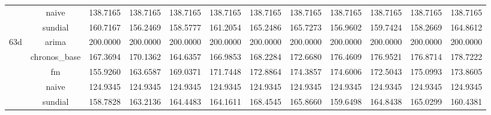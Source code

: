 \begin{table}[H]
{\begin{tabular}{cccccccccccc}
 & naive & 138.7165 & 138.7165 & 138.7165 & 138.7165 & 138.7165 & 138.7165 & 138.7165 & 138.7165 & 138.7165 & 138.7165 \\
 & sundial & 160.7167 & 156.2469 & 158.5777 & 161.2054 & 165.2486 & 165.7273 & 156.9602 & 159.7424 & 158.2669 & 164.8612 \\
\multirow[c]{5}{*}{63d} & arima & 200.0000 & 200.0000 & 200.0000 & 200.0000 & 200.0000 & 200.0000 & 200.0000 & 200.0000 & 200.0000 & 200.0000 \\
 & chronos_base & 167.3694 & 170.1362 & 164.6357 & 166.9853 & 168.2284 & 172.6680 & 176.4609 & 176.9521 & 176.8714 & 178.7222 \\
 & fm & 155.9260 & 163.6587 & 169.0371 & 171.7448 & 172.8864 & 174.3857 & 174.6006 & 172.5043 & 175.0993 & 173.8605 \\
 & naive & 124.9345 & 124.9345 & 124.9345 & 124.9345 & 124.9345 & 124.9345 & 124.9345 & 124.9345 & 124.9345 & 124.9345 \\
 & sundial & 158.7828 & 163.2136 & 164.4483 & 164.1611 & 168.4545 & 165.8660 & 159.6498 & 164.8438 & 165.0299 & 160.4381 \\
\bottomrule
\end{tabular}

 }
\end{table}